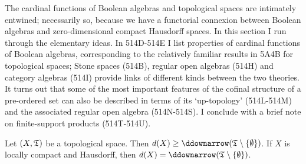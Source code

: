 
\def\nw{\mathop{\text{nw}}}
\def\triplepc#1#2#3{(#1,#2,\hbox{$<$}#3)}
\def\congforc{\cong_{\text{forcing}}}
\def\chaptername{Cardinal functions}
\def\sectionname{Boolean algebras}


The cardinal functions of Boolean algebras and topological spaces are
intimately entwined;  necessarily so, because we have a functorial
connexion between Boolean algebras and zero-dimensional compact
Hausdorff spaces.   In this section I run through the
elementary ideas.   In 514D-514E I list properties of cardinal
functions of
Boolean algebras, corresponding to the relatively familiar results in
5A4B for topological spaces;
Stone spaces (514B), regular open algebras (514H) and category algebras
(514I) provide links of
different kinds between the two theories.   It turns out that some of
the most important features of the cofinal structure of a
pre-ordered set can also be described in terms of its
`up-topology' (514L-514M) and the associated regular open algebra
(514N-514S).
I conclude with a brief note on finite-support products (514T-514U).

 Let $(X,\frak T)$ be a topological space.
Then $d(X)\ge\ddownarrow(\frak T\setminus\{\emptyset\})$.
If $X$ is locally compact and Hausdorff, then
$d(X)=\ddownarrow(\frak T\setminus\{\emptyset\})$.


